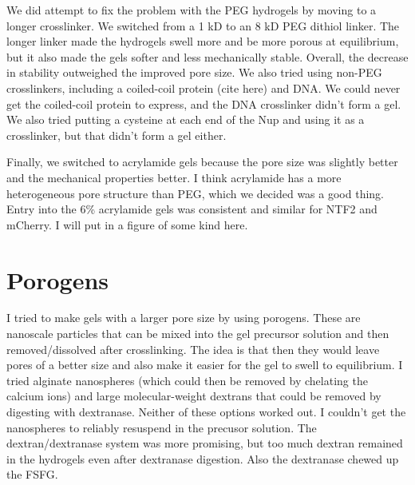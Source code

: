 We did attempt to fix the problem with the PEG hydrogels by moving to a longer crosslinker.  We switched from a 1 kD to an 8 kD PEG dithiol linker.  The longer linker made the hydrogels swell more and be more porous at equilibrium, but it also made the gels softer and less mechanically stable.  Overall, the decrease in stability outweighed the improved pore size.  We also tried using non-PEG crosslinkers, including a coiled-coil protein (cite here) and DNA.  We could never get the coiled-coil protein to express, and the DNA crosslinker didn't form a gel.  We also tried putting a cysteine at each end of the Nup and using it as a crosslinker, but that didn't form a gel either.

Finally, we switched to acrylamide gels because the pore size was slightly better and the mechanical properties better.  I think acrylamide has a more heterogeneous pore structure than PEG, which we decided was a good thing.  Entry into the 6\% acrylamide gels was consistent and similar for NTF2 and mCherry.  I will put in a figure of some kind here.

\section{Porogens}

I tried to make gels with a larger pore size by using porogens.  These are nanoscale particles that can be mixed into the gel precursor solution and then removed/dissolved after crosslinking.  The idea is that then they would leave pores of a better size and also make it easier for the gel to swell to equilibrium.  I tried alginate nanospheres (which could then be removed by chelating the calcium ions) and large molecular-weight dextrans that could be removed by digesting with dextranase.  Neither of these options worked out.  I couldn't get the nanospheres to reliably resuspend in the precusor solution.  The dextran/dextranase system was more promising, but too much dextran remained in the hydrogels even after dextranase digestion.  Also the dextranase chewed up the FSFG.

